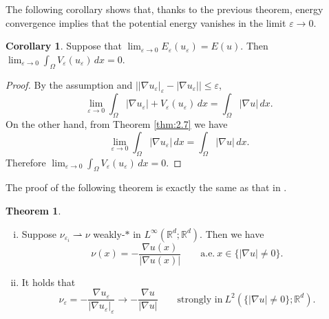\documentclass{amsart}
\theoremstyle{definition}
\newtheorem{theorem}[definition]{Theorem}
\newtheorem{corollary}[definition]{Corollary}
\def\R{{\mathbb{R}}}
\begin{document}
The following corollary shows that, thanks to the previous theorem, energy convergence implies that the potential energy vanishes in the limit $\varepsilon \to0$.


\begin{corollary}
    Suppose that $\lim_{\varepsilon \to 0} E_{\varepsilon} (u_\varepsilon) =E(u)$. Then
    $\lim_{\varepsilon \to 0} \int_{\Omega} V_{\varepsilon} (u_\varepsilon) \, dx =0$.
\end{corollary}

\begin{proof}
By the assumption and $\big||\nabla u_\varepsilon|_\varepsilon -|\nabla u_\varepsilon|\big| \leq \varepsilon$,
\[
\lim_{\varepsilon \to 0} 
\int_{\Omega} |\nabla u_\varepsilon| +V_\varepsilon (u_\varepsilon) \, dx
= \int_{\Omega} |\nabla u| \, dx.
\]
On the other hand, from Theorem \ref{thm:2.7} we have
\[
\lim_{\varepsilon \to 0} \int_{\Omega} |\nabla u_\varepsilon| \, dx
= \int_{\Omega} |\nabla u| \, dx.
\]
Therefore $\lim_{\varepsilon \to 0} \int_{\Omega} V_{\varepsilon} (u_\varepsilon) \, dx =0$.
\end{proof}

The proof of the following theorem is exactly the same as that in \cite{MR1315658}. 
\begin{theorem}\label{thm:2.9}
\begin{enumerate}[(i)]
    \item \label{thm2.9:i} Suppose $\nu_{\varepsilon_i} \rightharpoonup \nu$ weakly-$\ast$ in $L^\infty (\R^d;\R^d)$. Then we have
    \begin{equation}
    \nu (x)= -\frac{\nabla u (x)}{|\nabla u (x)|}
    \qquad \text{a.e.} \ x \in \{ |\nabla u| \not =0 \}.
    \end{equation}
    \item\label{thm2.9:ii} It holds that
    \begin{equation}
    \nu_{\varepsilon}=-\frac{\nabla u_{\varepsilon}}{|\nabla u_{\varepsilon}|_{\varepsilon}}
    \to -
    \frac{\nabla u}{|\nabla u|}
    \qquad 
    \text{strongly in} \ L^2 (\{ |\nabla u| \not =0 \} ; \R^d).
    \end{equation}
\end{enumerate}
\end{theorem}
\end{document}
